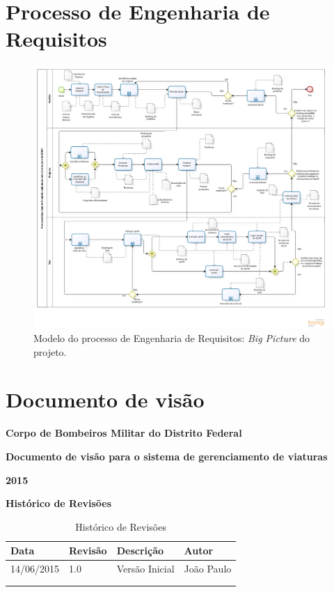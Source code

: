 \begin{apendicesenv}
  
  \chapter{Processo de Engenharia de Requisitos}
  
    \begin{figure}[!htbp]
      \centering
      \includegraphics[scale=0.46, angle = 90]{editaveis/figuras/project_big_picture}
      \caption[Modelo do processo de Engenharia de Requisitos]
	  {Modelo do processo de Engenharia de Requisitos: \textit{Big Picture} do projeto.}
      \label{project_big_picture}
    \end{figure}
  
  \chapter{Documento de visão}
	{\centering
	\textbf{Corpo de Bombeiros Militar do Distrito Federal}

	\textbf{Documento de visão para o sistema de gerenciamento de viaturas}

	\textbf{2015}

	}
	\textbf{Histórico de Revisões}
	\begin{table}[h]
	\centering
	\label{my-label}
	\begin{tabular}{|l|l|l|l|}
	\hline
	Data & Revisão & Descrição & Autor \\ \hline
	14/06/2015 & 1.0 & Versão Inicial & João Paulo \\ \hline
	     &         &           &       \\ \hline
	     &         &           &       \\ \hline
	\end{tabular}
	\caption{Histórico de Revisões}
	\end{table}
  

\end{apendicesenv}
